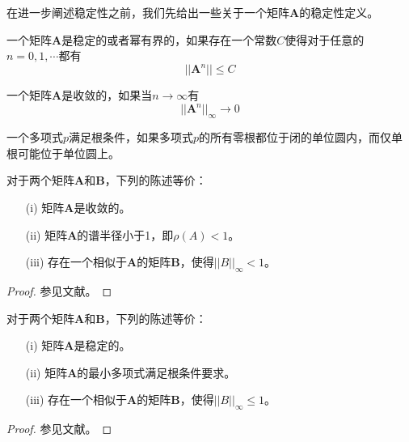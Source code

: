 在进一步阐述稳定性之前，我们先给出一些关于一个矩阵$\bm{A}$的稳定性定义。%
\begin{definition}
一个矩阵$\bm{A}$是稳定的或者幂有界的\cite{Burrage1995,Butcher2008}，如果存在一个常数$C$使得对于任意的$n=0,1,\cdots$都有
\begin{equation}
||\bm{A}^n||\le C
\end{equation}
\end{definition}%
\begin{definition}[矩阵的收敛性]
一个矩阵$\bm{A}$是收敛的\cite{Burrage1995,Butcher2008}，如果当$n\to\infty$有
\begin{equation}
||\bm{A}^n||_{\infty}\to0
\end{equation}
\end{definition}%
\begin{definition}[多项式的根条件]
一个多项式$p$满足根条件\cite{Burrage1995,李寿佛2010}，如果多项式$p$的所有零根都位于闭的单位圆内，而仅单根可能位于单位圆上。
\end{definition}%
\begin{theorem}[矩阵收敛的等价条件]
对于两个矩阵$\bm{A}$和$\bm{B}$，下列的陈述等价\cite{Burrage1995,Butcher2008}：\begin{itemize}
\item[(i)] 矩阵$\bm{A}$是收敛的。
\item[(ii)] 矩阵$\bm{A}$的谱半径小于1，即$\rho(A)<1$。
\item[(iii)] 存在一个相似于$\bm{A}$的矩阵$\bm{B}$，使得$||B||_{\infty}<1$。
\end{itemize}
\end{theorem}%
\begin{proof}
参见文献。
\end{proof}%
\begin{theorem}[矩阵稳定的等价条件]
对于两个矩阵$\bm{A}$和$\bm{B}$，下列的陈述等价\cite{Burrage1995,Butcher2008}：\begin{itemize}
\item[(i)] 矩阵$\bm{A}$是稳定的。
\item[(ii)] 矩阵$\bm{A}$的最小多项式满足根条件要求。
\item[(iii)] 存在一个相似于$\bm{A}$的矩阵$\bm{B}$，使得$||B||_{\infty}\le1$。
\end{itemize}
\end{theorem}%
\begin{proof}
参见文献。
\end{proof}

